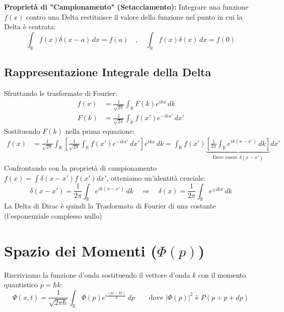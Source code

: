 \documentclass[11pt, a4paper]{article}
\begin{document}
\textbf{Proprietà di "Campionamento" (Setacciamento):} %
Integrare una funzione $f(x)$ contro una Delta restituisce il valore della funzione nel punto in cui la Delta è centrata: %
\begin{equation}
    \boxed{ \int_{\mathbb{R}} f(x) \delta(x-a) \, dx = f(a) } \quad , \quad \int_{\mathbb{R}} f(x) \delta(x) \, dx = f(0) %
\end{equation}

\subsection{Rappresentazione Integrale della Delta} %

Sfruttando le trasformate di Fourier: %
\begin{align*}
    f(x) &= \frac{1}{\sqrt{2\pi}} \int_{\mathbb{R}} F(k) e^{ikx} \, dk \\ %
    F(k) &= \frac{1}{\sqrt{2\pi}} \int_{\mathbb{R}} f(x') e^{-ikx'} \, dx' %
\end{align*}
Sostituendo $F(k)$ nella prima equazione: %
\begin{align*}
    f(x) &= \frac{1}{\sqrt{2\pi}} \int_{\mathbb{R}} \left[ \frac{1}{\sqrt{2\pi}} \int_{\mathbb{R}} f(x') e^{-ikx'} \, dx' \right] e^{ikx} \, dk = \int_{\mathbb{R}} f(x') \underbrace{ \left[ \frac{1}{2\pi} \int_{\mathbb{R}} e^{ik(x-x')} \, dk \right] }_{\text{Deve essere } \delta(x-x')} dx' %
\end{align*}
Confrontando con la proprietà di campionamento $f(x) = \int \delta(x-x') f(x') dx'$, otteniamo un'identità cruciale: %
\begin{equation}
    \boxed{ \delta(x-x') = \frac{1}{2\pi} \int_{\mathbb{R}} e^{ik(x-x')} \, dk } \quad \Rightarrow \quad \delta(x) = \frac{1}{2\pi} \int_{\mathbb{R}} e^{\pm ikx} \, dk %
\end{equation}
La Delta di Dirac è quindi la Trasformata di Fourier di una costante (l'esponenziale complesso nullo) %

\section{Spazio dei Momenti ($\Phi(p)$)} %

Riscriviamo la funzione d'onda sostituendo il vettore d'onda $k$ con il momento quantistico $p = \hbar k$: %
\begin{equation}
    \Psi(x,t) = \frac{1}{\sqrt{2\pi\hbar}} \int_{\mathbb{R}} \Phi(p) e^{i\frac{(px - Et)}{\hbar}} \, dp \qquad \text{dove } |\Phi(p)|^2 \text{ è } P(p \div p+dp) %
\end{equation}
\end{document}
